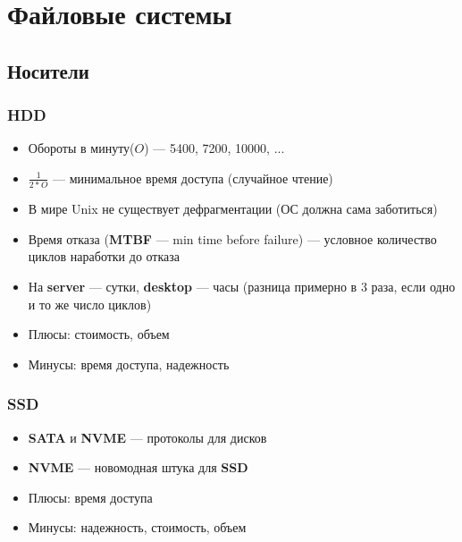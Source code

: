 \documentclass[../../lectures.tex]{subfiles}
\begin{document}
\chapter{Файловые системы}

\section{Носители}
\subsection{HDD}
\begin{itemize}
    \item Обороты в минуту($O$) --- 5400, 7200, 10000, ...
    \item $\frac{1}{2 * O}$ --- минимальное время доступа (случайное чтение)
    \item В мире Unix не существует дефрагментации (ОС должна сама заботиться)
    \item Время отказа (\textbf{MTBF} --- min time before failure) --- условное 
          количество циклов наработки до отказа
    \item На \textbf{server} --- сутки, \textbf{desktop} --- часы (разница примерно в 3 раза, 
          если одно и то же число циклов)
    \item Плюсы: стоимость, объем
    \item Минусы: время доступа, надежность
\end{itemize}

\subsection{SSD}
\begin{itemize}
    \item \textbf{SATA} и \textbf{NVME} --- протоколы для дисков
    \item \textbf{NVME} --- новомодная штука для \textbf{SSD}
    \item Плюсы: время доступа
    \item Минусы: надежность, стоимость, объем
\end{itemize}
\end{document}
